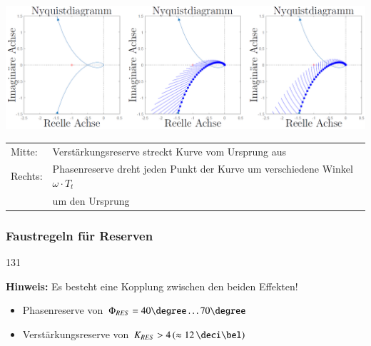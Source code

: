 \includegraphics[width=\columnwidth]{images/nyquist_stabilitaetsreserven.png}

\begin{tabular}{ll}
    Mitte:  & Verstärkungsreserve streckt Kurve vom Ursprung aus \\
    Rechts: & Phasenreserve dreht jeden Punkt der Kurve um verschiedene Winkel $\omega \cdot T_t$ \\
            & um den Ursprung  
\end{tabular}


\subsubsection{Faustregeln für Reserven}{131}

\textbf{Hinweis:} Es besteht eine Kopplung zwischen den beiden Effekten!

\begin{itemize}
    \item Phasenreserve von $\Phi_{RES} = 40 \degree \ldots 70 \degree$
    \item Verstärkungsreserve von $K_{RES} > 4 \, (\approx 12 \, \deci \bel)$
\end{itemize}